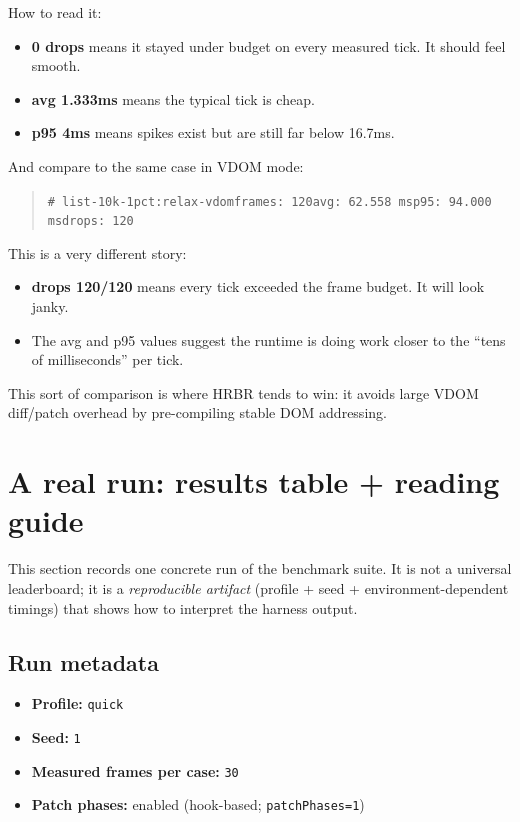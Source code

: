 How to read it:

\begin{itemize}
\item \textbf{0 drops} means it stayed under budget on every measured tick. It should feel smooth.
\item \textbf{avg 1.333ms} means the typical tick is cheap.
\item \textbf{p95 4ms} means spikes exist but are still far below 16.7ms.
\end{itemize}

And compare to the same case in VDOM mode:

\begin{quote}
	\texttt{\# list-10k-1pct:relax-vdom\newline frames: 120\newline avg: 62.558 ms\newline p95: 94.000 ms\newline drops: 120}
\end{quote}

This is a very different story:

\begin{itemize}
\item \textbf{drops 120/120} means every tick exceeded the frame budget. It will look janky.
\item The avg and p95 values suggest the runtime is doing work closer to the ``tens of milliseconds'' per tick.
\end{itemize}

This sort of comparison is where HRBR tends to win: it avoids large VDOM diff/patch overhead by pre-compiling stable DOM addressing.

\section{A real run: results table + reading guide}

This section records one concrete run of the benchmark suite.
It is not a universal leaderboard; it is a \emph{reproducible artifact} (profile + seed + environment-dependent timings) that shows how to interpret the harness output.

\subsection{Run metadata}

\begin{itemize}
\item \textbf{Profile:} \texttt{quick}
\item \textbf{Seed:} \texttt{1}
\item \textbf{Measured frames per case:} \texttt{30}
\item \textbf{Patch phases:} enabled (hook-based; \texttt{patchPhases=1})
\end{itemize}

